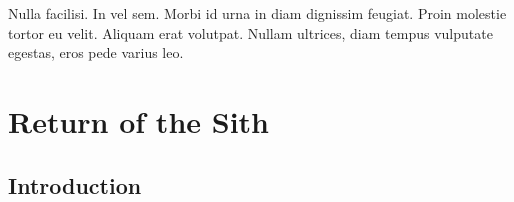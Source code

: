 \graphicspath{{figures/chapter-4/}}


\begin{savequote}[75mm]
Nulla facilisi. In vel sem. Morbi id urna in diam dignissim feugiat. Proin molestie tortor eu velit. Aliquam erat volutpat. Nullam    ultrices, diam tempus vulputate egestas, eros pede varius leo.
\end{savequote}

\chapter{Return of the Sith}


\section{Introduction}

\lipsum[15-19]
\cite{Lucas3}


